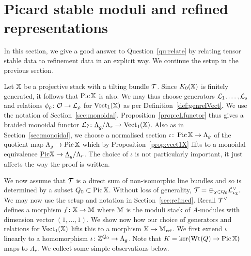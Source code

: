 \documentclass[12pt]{amsart}
\begin{document}
\section{Picard stable moduli and refined representations}  
\label{sec:Picard}

In this section, we give a good answer to Question~\ref{qu:relate} by relating tensor stable data to refinement data in an explicit way. We continue the setup in the previous section. 

Let $\mathbb{X}$ be a projective stack with a tilting bundle $\mathcal{T}$. Since $K_0(\mathbb{X})$ is finitely generated, it follows that $\operatorname{Pic} \mathbb{X}$ is also. We may thus choose generators $\mathcal{L}_1, \ldots, \mathcal{L}_s$ and relations $\phi_{\rho} \colon \mathcal{O} \to \mathcal{L}_{\rho}$ for $\operatorname{Vect}_1(\mathbb{X})$ as per Definition~\ref{def:genrelVect}. We use the notation of Section~\ref{sec:monoidal}.  Proposition~\ref{prop:cLfunctor} thus gives a braided monoidal functor $\mathcal{L}_?\colon \underline{\Lambda}_g/\Lambda_r \to \operatorname{Vect}_1(\mathbb{X})$. Also as in Section~\ref{sec:monoidal}, we choose a normalised section $\iota \colon \operatorname{Pic} \mathbb{X} \to \Lambda_g$ of the quotient map $\Lambda_g \to \operatorname{Pic} \mathbb{X}$ which by Proposition~\ref{prop:vect1X} lifts to a monoidal equivalence $\underline{\operatorname{Pic}} \mathbb{X} \to \underline{\Lambda}_g/\Lambda_r$. The choice of $\iota$ is not particularly important, it just affects the way the proof is written. 

We now assume that $\mathcal{T}$ is a direct sum of non-isomorphic line bundles and so is determined by a subset $Q_0 \subset \operatorname{Pic} \mathbb{X}$. Without loss of generality, $\mathcal{T} = \oplus_{\chi \in Q_0} \mathcal{L}_{\iota \chi}^{\vee}$.  We may now use the setup and notation in Section~\ref{sec:refined}. Recall $\mathcal{T}^{\vee}$ defines a morphism $f \colon \mathbb{X} \to \mathbb{M}$ where $\mathbb{M}$ is the moduli stack of $A$-modules with dimension vector $(1,\ldots,1)$. We show now how our choice of generators and relations for $\operatorname{Vect}_1(\mathbb{X})$ lifts this to a morphism $\mathbb{X} \to \mathbb{M}_{\textup{ref}}$. We first extend $\iota$ linearly to a homomorphism $\iota \colon \mathbb{Z}^{Q_0} \to \Lambda_g$. Note that $K = \ker(\textup{Wt}(Q) \to \operatorname{Pic} \mathbb{X})$ maps to $\Lambda_r$. We collect some simple observations below.
\end{document}
